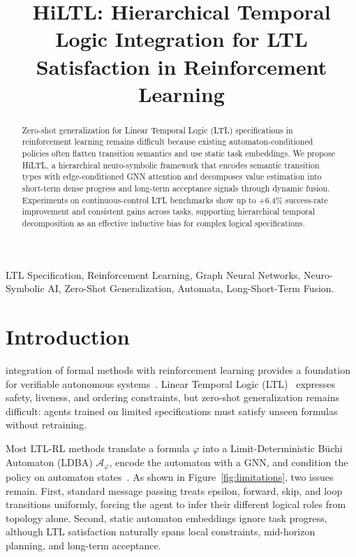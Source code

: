 \documentclass[conference]{IEEEtran}
\begin{document}
\title{HiLTL: Hierarchical Temporal Logic Integration for LTL Satisfaction in Reinforcement Learning}


\author{
}

\maketitle

\begin{abstract}
Zero-shot generalization for Linear Temporal Logic (LTL) specifications in reinforcement learning remains difficult because existing automaton-conditioned policies often flatten transition semantics and use static task embeddings. We propose HiLTL, a hierarchical neuro-symbolic framework that encodes semantic transition types with edge-conditioned GNN attention and decomposes value estimation into short-term dense progress and long-term acceptance signals through dynamic fusion. Experiments on continuous-control LTL benchmarks show up to +6.4\% success-rate improvement and consistent gains across tasks, supporting hierarchical temporal decomposition as an effective inductive bias for complex logical specifications.
\end{abstract}

\begin{IEEEkeywords}
LTL Specification, Reinforcement Learning, Graph Neural Networks, Neuro-Symbolic AI, Zero-Shot Generalization, Automata, Long-Short-Term Fusion.
\end{IEEEkeywords}






\section{Introduction}

 integration of formal methods with reinforcement learning provides a foundation for verifiable autonomous systems~\citep{Baier2008}. Linear Temporal Logic (LTL)~\citep{Pnueli1977} expresses safety, liveness, and ordering constraints, but zero-shot generalization remains difficult: agents trained on limited specifications must satisfy unseen formulas without retraining.

Most LTL-RL methods translate a formula $\varphi$ into a Limit-Deterministic B\"uchi Automaton (LDBA) $\mathcal{A}_\varphi$, encode the automaton with a GNN, and condition the policy on automaton states~\citep{IcarteRewardMachines2019,deepltl}. As shown in Figure~\ref{fig:limitations}, two issues remain. First, standard message passing treats epsilon, forward, skip, and loop transitions uniformly, forcing the agent to infer their different logical roles from topology alone. Second, static automaton embeddings ignore task progress, although LTL satisfaction naturally spans local constraints, mid-horizon planning, and long-term acceptance.
\end{document}
